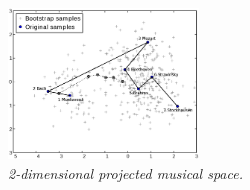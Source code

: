 \documentclass[
 aip,
 jmp,
 amsmath,amssymb,
 reprint,
]{revtex4-1}
\begin{document}
\begin{figure}[htbp]
  \begin{center}
    \includegraphics[width=0.45\textwidth]{g1}
  \end{center}
  \caption{\it 2-dimensional projected musical space.}
  \label{fig:pca}
\end{figure}
\end{document}
